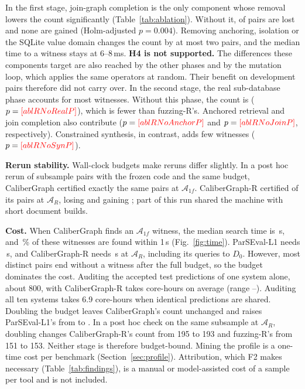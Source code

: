 In the first stage, join-graph completion is the only component whose removal lowers the count significantly (Table~\ref{tab:ablation}). Without it,  of  pairs are lost and none are gained (Holm-adjusted $p=0.004$). Removing anchoring, isolation or the SQLite value domain changes the count by at most two pairs, and the median time to a witness stays at 6--8\,ms. \textbf{H4 is not supported.} The differences these components target are also reached by the other phases and by the mutation loop, which applies the same operators at random. Their benefit on development pairs therefore did not carry over. In the second stage, the real sub-database phase accounts for most witnesses. Without this phase, the count is  ($p=\V{ablRNoRealP}$), which is fewer than fuzzing-R's. Anchored retrieval and join completion also contribute ($p=\V{ablRNoAnchorP}$ and $p=\V{ablRNoJoinP}$, respectively). Constrained synthesis, in contrast, adds few witnesses ($p=\V{ablRNoSynP}$).

\textbf{Rerun stability.} Wall-clock budgets make reruns differ slightly. In a post hoc rerun of  subsample pairs with the frozen code and the same budget, CaliberGraph certified exactly the same  pairs at $\mathcal A_{1f}$. CaliberGraph-R certified  of its  pairs at $\mathcal A_R$, losing  and gaining ; part of this run shared the machine with short document builds.

\textbf{Cost.} When CaliberGraph finds an $\mathcal A_{1f}$ witness, the median search time is \,s, and \,\% of these witnesses are found within 1\,s (Fig.~\ref{fig:time}). ParSEval-L1 needs \,s, and CaliberGraph-R needs \,s at $\mathcal A_R$, including its queries to $D_0$. However, most distinct pairs end without a witness after the full budget, so the budget dominates the cost. Auditing the accepted test predictions of one system alone, about 800, with CaliberGraph-R takes  core-hours on average (range --). Auditing all ten systems takes 6.9 core-hours when identical predictions are shared. Doubling the budget leaves CaliberGraph's count unchanged and raises ParSEval-L1's from  to . In a post hoc check on the same subsample at $\mathcal A_R$, doubling changes CaliberGraph-R's count from 195 to 193 and fuzzing-R's from 151 to 153. Neither stage is therefore budget-bound. Mining the profile is a one-time cost per benchmark (Section~\ref{sec:profile}). Attribution, which F2 makes necessary (Table~\ref{tab:findings}), is a manual or model-assisted cost of a sample per tool and is not included.

